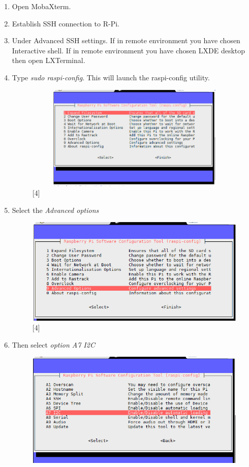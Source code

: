 \documentclass[a4paper,12pt,oneside]{book}
\begin{document}
\begin{enumerate}
		\item Open MobaXterm. 
		\item Establish SSH connection to R-Pi.
		\item Under Advanced SSH settings.
		\subitem If in remote environment you have chosen Interactive shell.
		\subitem If in remote environment you have chosen LXDE desktop then open LXTerminal.
		
		\item  Type \textit{sudo raspi-config}. This will launch the raspi-config utility.
		
		\begin{figure}[h!]
			\includegraphics[width=11cm,height=5cm]{i2c_1}
			\centering
			\caption{[4]}
			\end{figure}
		\item Select the \textit{Advanced options}
		\begin{figure}[h!]
			\includegraphics[scale=0.6]{i2c_2}
			\centering
			\caption{[4]}
		\end{figure} 
		\item Then select \textit{option A7 I2C} 
		\newline
		\begin{figure}[h!]
			\includegraphics[scale=0.6]{i2c_3}

\end{figure}
\end{enumerate}
\end{document}
